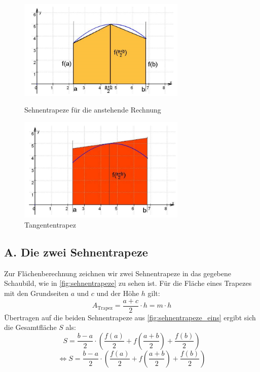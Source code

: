 \begin{figure}[!tbp]
    \centering
    \begin{minipage}[b]{0.4\textwidth}
        \includegraphics[width=8cm]{Bilder/sehnentrapeze.png}
      \caption{Sehnentrapeze für die anstehende Rechnung}
      \label{fig:sehnentrapeze_eins}
    \end{minipage}
    \hfill
    \begin{minipage}[b]{0.4\textwidth}
        \includegraphics[width=8cm]{Bilder/sehnentrapez_addiert.png}
      \caption{Tangententrapez  \cite{skript}}
      \label{fig:sehnentrapeze_zwei}
    \end{minipage}
    \label{fig:sehnentrapeze}
  \end{figure}
\subsection*{A. Die zwei Sehnentrapeze}

Zur Flächenberechnung zeichnen wir zwei Sehnentrapeze in das gegebene Schaubild, wie in \autoref{fig:sehnentrapeze} zu sehen ist. Für die Fläche eines Trapezes mit den Grundseiten $a$ und $c$ und der Höhe $h$ gilt:
\[
A_{\text{Trapez}} = \frac{a + c}{2} \cdot h = m \cdot h
\]
Übertragen auf die beiden Sehnentrapeze aus \autoref{fig:sehnentrapeze_eins} ergibt sich die Gesamtfläche $S$ als:
\[
S = \frac{b - a}{2} \cdot \left(\frac{f(a)}{2} + f\left(\frac{a + b}{2}\right) + \frac{f(b)}{2}\right)
\]
\[
  \Leftrightarrow S = \frac{b - a}{2} \cdot \left(\frac{f(a)}{2} + f\left(\frac{a + b}{2}\right) + \frac{f(b)}{2}\right)
\]

